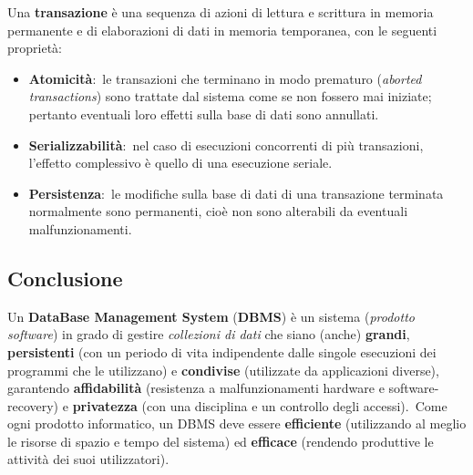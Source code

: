 \begin{definition}

	Una \textbf{transazione} è una sequenza di azioni di lettura e scrittura in memoria permanente e di elaborazioni di dati in memoria temporanea, con le seguenti proprietà:
	\begin{itemize}
		\item \textbf{Atomicità}:\ le transazioni che terminano in modo prematuro (\textit{aborted transactions}) sono trattate dal sistema come se non fossero mai iniziate; pertanto eventuali loro effetti sulla base di dati sono annullati.
		\item \textbf{Serializzabilità}:\ nel caso di esecuzioni concorrenti di più transazioni, l'effetto complessivo è quello di una esecuzione seriale.
		\item \textbf{Persistenza}:\ le modifiche sulla base di dati di una transazione terminata normalmente sono permanenti, cioè non sono alterabili da eventuali malfunzionamenti.
	\end{itemize}
\end{definition}

\subsection{Conclusione}

Un \textbf{DataBase Management System} (\textbf{DBMS}) è un sistema (\textit{prodotto software}) in grado di gestire \textit{collezioni di dati} che siano (anche) \textbf{grandi}, \textbf{persistenti} (con un periodo di vita indipendente dalle singole esecuzioni dei programmi che le utilizzano) e \textbf{condivise} (utilizzate da applicazioni diverse), garantendo \textbf{affidabilità} (resistenza a malfunzionamenti hardware e software-recovery) e \textbf{privatezza} (con una disciplina e un controllo degli accessi).\
Come ogni prodotto informatico, un DBMS deve essere \textbf{efficiente} (utilizzando al meglio le risorse di spazio e tempo del sistema)
ed \textbf{efficace} (rendendo produttive le attività dei suoi utilizzatori).


